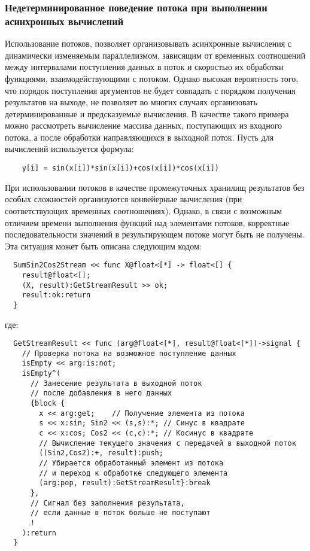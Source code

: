 \subsubsection{Недетерминированное поведение потока при выполнении асинхронных вычислений}

Использование потоков, позволяет организовывать асинхронные вычисления с динамически изменяемым параллелизмом, зависящим от временных соотношений между интервалами поступления данных в поток и скоростью их обработки функциями, взаимодействующими с потоком. Однако высокая вероятность того, что порядок поступления аргументов не будет совпадать с порядком получения результатов на выходе, не позволяет во многих случаях организовать детерминированные и предсказуемые вычисления. В качестве такого примера можно рассмотреть вычисление массива данных, поступающих из входного потока, а после обработки направляющихся в выходной поток. Пусть для вычислений используется формула:
\begin{verbatim}
    y[i] = sin(x[i])*sin(x[i])+cos(x[i])*cos(x[i])
\end{verbatim}
При использовании потоков в качестве промежуточных хранилищ результатов без особых сложностей организуются конвейерные вычисления (при соответствующих временных соотношениях). Однако, в связи с возможным отличием времени выполнения функций над элементами потоков, корректные последовательности значений в результирующем потоке могут быть не получены. Эта ситуация может быть описана следующим кодом:

\begin{verbatim}
  SumSin2Cos2Stream << func X@float<[*] -> float<[] {
    result@float<[];
    (X, result):GetStreamResult >> ok;
    result:ok:return
  }
\end{verbatim}
где:
\begin{verbatim}
  GetStreamResult << func (arg@float<[*], result@float<[*])->signal {
    // Проверка потока на возможное поступление данных
    isEmpty << arg:is:not;
    isEmpty^(
      // Занесение результата в выходной поток
      // после добавления в него данных
      {block {
        x << arg:get;    // Получение элемента из потока
        s << x:sin; Sin2 << (s,s):*; // Синус в квадрате
        c << x:cos; Cos2 << (c,c):*; // Косинус в квадрате
        // Вычисление текущего значения с передачей в выходной поток
        ((Sin2,Cos2):+, result):push;
        // Убирается обработанный элемент из потока
        // и переход к обработке следующего элемента
        (arg:pop, result):GetStreamResult}:break
      },
      // Сигнал без заполнения результата,
      // если данные в поток больше не поступают
      !
    ):return
  }
\end{verbatim}

